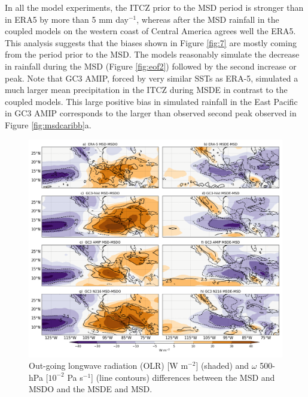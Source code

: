 In all the model experiments, the ITCZ prior to the MSD period is stronger than in ERA5 by more than 5 mm day$^{-1}$, whereas after the MSD rainfall in the coupled models on the western coast of Central America agrees well the ERA5. 
This analysis suggests that the biases shown in Figure \ref{fig:7} are mostly coming from the period prior to the MSD. The models reasonably simulate the decrease in rainfall during the MSD (Figure \ref{fig:eof2}) followed by the second increase or peak. 
Note that GC3 AMIP, forced by very similar SSTs as ERA-5, simulated a much larger mean precipitation in the ITCZ during MSDE in contrast to the coupled models. This large positive bias in simulated rainfall in the East Pacific in GC3 AMIP corresponds to the larger than observed second peak observed in Figure \ref{fig:msdcaribb}a. 


 \begin{figure}[t!]
\includegraphics[width=\linewidth]{figures/fig4_olrdiff.png}
\caption{Out-going longwave radiation (OLR) [W m$^{-2}$] (shaded) and $\omega$ 500-hPa [$10^{-2}$ Pa s$^{-1}$] (line contours) differences between the MSD and MSDO and the MSDE and MSD.}
\label{fig:msdolranom}
\end{figure}


